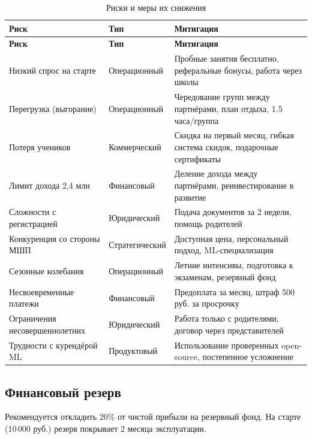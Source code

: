 \documentclass[12pt,a4paper]{article}
\begin{document}
\begin{longtable}{p{4cm}p{4cm}p{6cm}}
\caption{Риски и меры их снижения}
\label{tab:risks} \\
\toprule
\textbf{Риск} & \textbf{Тип} & \textbf{Митигация} \\
\midrule
\endfirsthead

\toprule
\textbf{Риск} & \textbf{Тип} & \textbf{Митигация} \\
\midrule
\endhead

Низкий спрос на старте & Операционный & Пробные занятия бесплатно, реферальные бонусы, работа через школы \\
Перегрузка (выгорание) & Операционный & Чередование групп между партнёрами, план отдыха, 1.5 часа/группа \\
Потеря учеников & Коммерческий & Скидка на первый месяц, гибкая система скидок, подарочные сертификаты \\
Лимит дохода 2,4 млн & Финансовый & Деление дохода между партнёрами, реинвестирование в развитие \\
Сложности с регистрацией & Юридический & Подача документов за 2 недели, помощь родителей \\
Конкуренция со стороны МШП & Стратегический & Доступная цена, персональный подход, ML-специализация \\
Сезонные колебания & Операционный & Летние интенсивы, подготовка к экзаменам, резервный фонд \\
Несвоевременные платежи & Финансовый & Предоплата за месяц, штраф 500 руб. за просрочку \\
Ограничения несовершеннолетних & Юридический & Работа только с родителями, договор через представителей \\
Трудности с курендёрой ML & Продуктовый & Использование проверенных open-source, постепенное усложнение \\
\bottomrule
\end{longtable}

\subsection{Финансовый резерв}

Рекомендуется откладить 20\% от чистой прибыли на резервный фонд. На старте (10\,000 руб.) резерв покрывает 2 месяца эксплуатации.

\end{document}
